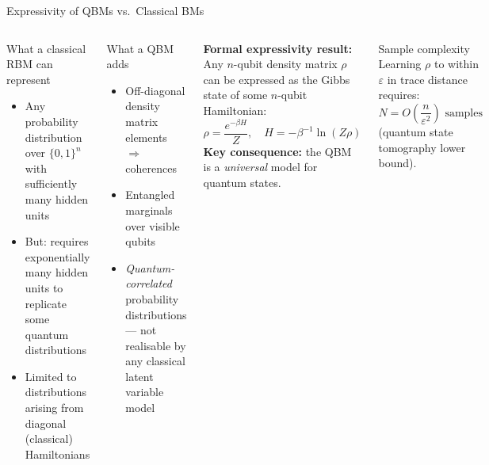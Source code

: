 \documentclass[aspectratio=169,10pt]{beamer}
\begin{document}
\begin{frame}{Expressivity of QBMs vs.\ Classical BMs}
  \begin{columns}[T]
      \begin{block}{What a classical RBM can represent}
        \begin{itemize}
          \item Any probability distribution over $\{0,1\}^n$
                with sufficiently many hidden units
          \item But: requires exponentially many hidden units
                to replicate some quantum distributions
          \item Limited to distributions arising from
                diagonal (classical) Hamiltonians
        \end{itemize}
      \end{block}
      \vspace{0.2cm}
      \begin{alertblock}{What a QBM adds}
        \begin{itemize}
          \item Off-diagonal density matrix elements
                $\Rightarrow$ coherences
          \item Entangled marginals over visible qubits
          \item \emph{Quantum-correlated} probability
                distributions — not realisable by any
                classical latent variable model
        \end{itemize}
      \end{alertblock}
      \textbf{Formal expressivity result:}\\
      Any $n$-qubit density matrix $\rho$ can be expressed as
      the Gibbs state of some $n$-qubit Hamiltonian:
      \[
        \rho = \frac{e^{-\beta H}}{Z},\quad
        H = -\beta^{-1}\ln(Z\rho)
      \]
      \textbf{Key consequence:} the QBM is a
      \emph{universal} model for quantum states.

      \vspace{0.3cm}
      \begin{block}{Sample complexity}
        Learning $\rho$ to within $\varepsilon$
        in trace distance requires:
        \[
          N = O\!\left(\frac{n}{\varepsilon^2}\right)
          \text{ samples}
        \]
        (quantum state tomography lower bound).
      \end{block}
  \end{columns}
\end{frame}
\end{document}
